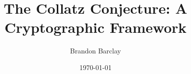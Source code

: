\documentclass[12pt]{article}
\title{The Collatz Conjecture: A Cryptographic Framework}
\author{Brandon Barclay}
\date{\today}
\theoremstyle{plain}
\theoremstyle{definition}
\begin{document}
\maketitle

\begin{abstract}

\end{abstract}

\tableofcontents
\newpage












\appendix




\end{document}
